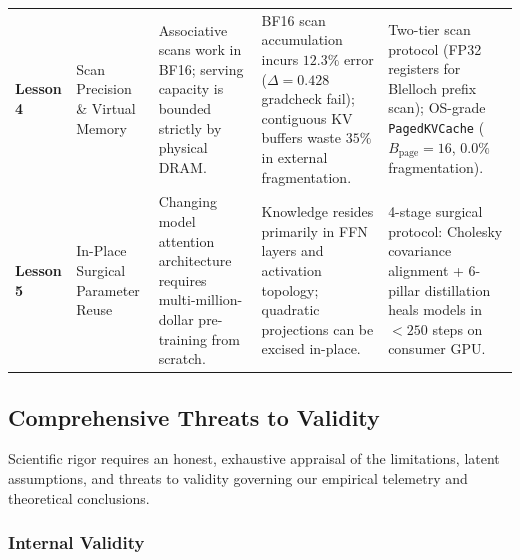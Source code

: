 \begin{table}[t]
{\begin{tabular}{l p{2.5cm} p{3.1cm} p{4.2cm} p{3.6cm}}
\textbf{Lesson 4} &
Scan Precision \& Virtual Memory &
Associative scans work in BF16; serving capacity is bounded strictly by physical DRAM. &
BF16 scan accumulation incurs $12.3\%$ error ($\Delta=0.428$ gradcheck fail); contiguous KV buffers waste $35\%$ in external fragmentation. &
Two-tier scan protocol (FP32 registers for Blelloch prefix scan); OS-grade \texttt{PagedKVCache} ($B_{\text{page}}=16$, $0.0\%$ fragmentation). \\
\addlinespace[3pt]

\textbf{Lesson 5} &
In-Place Surgical Parameter Reuse &
Changing model attention architecture requires multi-million-dollar pre-training from scratch. &
Knowledge resides primarily in FFN layers and activation topology; quadratic projections can be excised in-place. &
4-stage surgical protocol: Cholesky covariance alignment + 6-pillar distillation heals models in $<250$ steps on consumer GPU. \\
\bottomrule
\end{tabular}%
}
\end{table}

\subsection{Comprehensive Threats to Validity}
\label{subsec:threats_to_validity}

Scientific rigor requires an honest, exhaustive appraisal of the limitations, latent assumptions, and threats to validity governing our empirical telemetry and theoretical conclusions.

\subsubsection{Internal Validity}
\label{subsubsec:internal_validity}

